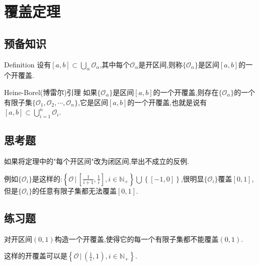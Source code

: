 \section{覆盖定理}
 \subsection{预备知识}
     \begin{definition}[开覆盖]{Definition}
         设有$[a,b]\subset\textstyle\bigcup_\alpha\mathcal{O} _\alpha$,其中每个$\mathcal{O}_\alpha$是开区间,则称$\{\mathcal{O}_\alpha\}$是区间$[a,b]$的一个开覆盖.
     \end{definition}
     \begin{theorem}[覆盖定理]{Heine-Borel(博雷尔)引理}
         如果$\{\mathcal{O}_\alpha\}$是区间$[a,b]$的一个开覆盖,则存在$\{\mathcal{O}_\alpha\}$的一个有限子集$\{\mathcal{O}_1,\mathcal{O}_2,\cdots,\mathcal{O}_n\}$,它是区间$[a,b]$的一个开覆盖,也就是说有$[a,b]\subset\textstyle\bigcup_{i=1}^n\mathcal{O}_i$.
     \end{theorem}
 \subsection{思考题}
     \begin{example}
         如果将定理中的"每个开区间"改为闭区间,举出不成立的反例.
     \end{example}
     \begin{solution}
         例如$\{\mathcal{O}_i\}$是这样的:$\left\{\mathcal{O}\, \bigg|\, \left[\frac{1}{i+1},\frac{1}{i}\right],i\in \mathbb{N}_+\right\}\textstyle\bigcup\left\{[-1,0]\right\}$,很明显$\{\mathcal{O}_i\}$覆盖$\left[0,1\right]$,但是$\{\mathcal{O}_i\}$的任意有限子集都无法覆盖$\left[0,1\right]$.
     \end{solution}

 \subsection{练习题}
     \begin{exercise}
         对开区间$(0,1)$构造一个开覆盖,使得它的每一个有限子集都不能覆盖$(0,1)$.
     \end{exercise}
     \begin{solution}
         这样的开覆盖可以是$\left\{\mathcal{O}\, \bigg|\, \left(\frac{1}{i},1\right),i\in\mathbb{N}_+\right\}$.
     \end{solution}

